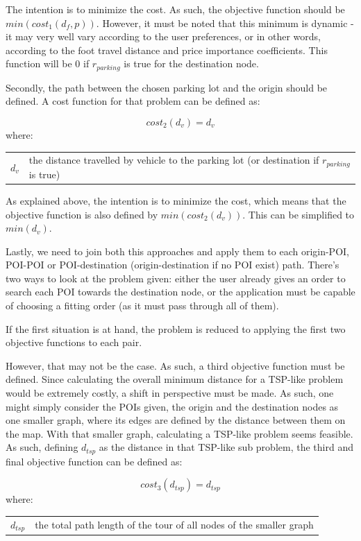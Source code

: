 \documentclass[a4paper, 12pt]{report}
\makeatletter
\newenvironment{conditions}
  {\par\vspace{\abovedisplayskip}\noindent\begin{tabular}{>{$}l<{$} @{${}={}$} l}}
  {\end{tabular}\par\vspace{\belowdisplayskip}}
\makeatother
\begin{document}
    The intention is to minimize the cost. As such, the objective function should be $min(cost_1(d_f, p))$. However, it must be noted that this minimum is dynamic - it may very well vary according to the user preferences, or in other words, according to the foot travel distance and price importance coefficients. This function will be 0 if $r_{parking}$ is true for the destination node.
    
    Secondly, the path between the chosen parking lot and the origin should be defined. A cost function for that problem can be defined as:
    
    \begin{equation}
        cost_2(d_v) = d_v
    \end{equation}
    where:
    \begin{conditions}
        d_v     &  the distance travelled by vehicle to the parking lot (or destination if $r_{parking}$ is true)\\
    \end{conditions}
    
    As explained above, the intention is to minimize the cost, which means that the objective function is also defined by $min(cost_2(d_v))$. This can be simplified to $min(d_v)$.
    
    Lastly, we need to join both this approaches and apply them to each origin-POI, POI-POI or POI-destination (origin-destination if no POI exist) path. There's two ways to look at the problem given: either the user already gives an order to search each POI towards the destination node, or the application must be capable of choosing a fitting order (as it must pass through all of them).
    
    If the first situation is at hand, the problem is reduced to applying the first two objective functions to each pair. 
    
    However, that may not be the case. As such, a third objective function must be defined. Since calculating the overall minimum distance for a TSP-like problem would be extremely costly, a shift in perspective must be made. As such, one might simply consider the POIs given, the origin and the destination nodes as one smaller graph, where its edges are defined by the distance between them on the map. With that smaller graph, calculating a TSP-like problem seems feasible. As such, defining $d_{tsp}$ as the distance in that TSP-like sub problem, the third and final objective function can be defined as:
    
    \begin{equation}
        cost_3(d_{tsp}) = d_{tsp}
    \end{equation}
    where:
    \begin{conditions}
        d_{tsp}     &  the total path length of the tour of all nodes of the smaller graph \\
    \end{conditions}
    
\end{document}
